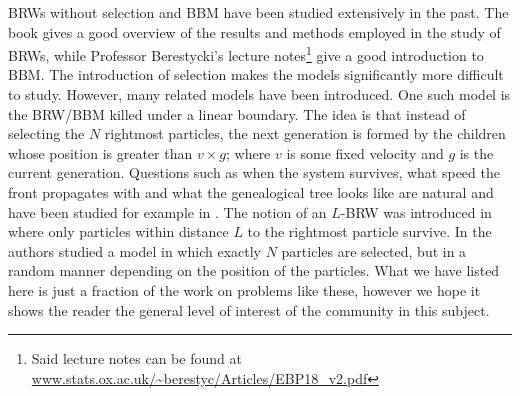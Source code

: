 \begin{remark}BRWs without selection and BBM have been studied extensively in the past. The book \cite{shi2015branching} gives a good overview of the results and methods employed in the study of BRWs, while Professor Berestycki's lecture notes\footnote{Said lecture notes can be found at \url{www.stats.ox.ac.uk/~berestyc/Articles/EBP18_v2.pdf}} give a good introduction to BBM. The introduction of selection makes the models significantly more difficult to study. However, many related models have been introduced. One such model is the BRW/BBM killed under a linear boundary. The idea is that instead of selecting the $N$ rightmost particles, the next generation is formed by the children whose position is greater than $v \times g$; where $v$ is some fixed velocity and $g$ is the current generation. Questions such as when the system survives, what speed the front propagates with and what the genealogical tree looks like are natural and have been studied for example in \cite{gantert2008asymptotics, harris2007survival, berestycki2013genealogy}. The notion of an $L$-BRW was introduced in \cite{brunet2006phenomenological} where only particles within distance $L$ to the rightmost particle survive. In \cite{cortines2016n} the authors studied a model in which exactly $N$ particles are selected, but in a random manner depending on the position of the particles. What we have listed here is just a fraction of the work on problems like these, however we hope it shows the reader the general level of interest of the community in this subject. 
\end{remark}








\newpage
